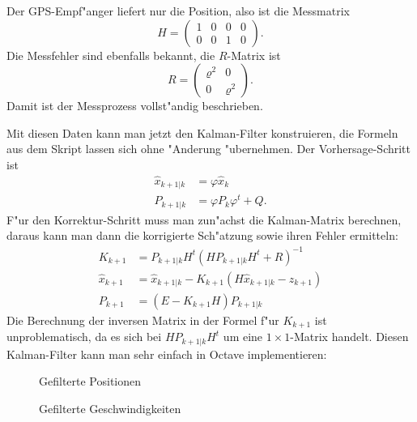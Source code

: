 \begin{loesung}
Der GPS-Empf"anger liefert nur die Position, also ist die Messmatrix
\[
H=
\begin{pmatrix}
1&0&0&0\\
0&0&1&0
\end{pmatrix}.
\]
Die Messfehler sind ebenfalls bekannt, die $R$-Matrix ist
\[
R=\begin{pmatrix}
\varrho^2&0\\
0&\varrho^2
\end{pmatrix}.
\]
Damit ist der Messprozess vollst"andig beschrieben.

Mit diesen Daten kann man jetzt den Kalman-Filter konstruieren, die
Formeln aus dem Skript lassen sich ohne "Anderung "ubernehmen.
Der Vorhersage-Schritt ist
\begin{align*}
\hat x_{k+1|k}&=\varphi \hat x_k
\\
P_{k+1|k}&=\varphi P_k\varphi^t+Q.
\end{align*}
F"ur den Korrektur-Schritt muss man zun"achst die Kalman-Matrix 
berechnen, daraus kann man dann die korrigierte Sch"atzung sowie
ihren Fehler ermitteln:
\begin{align*}
K_{k+1}&=P_{k+1|k}H^t(HP_{k+1|k}H^t+R)^{-1}
\\
\hat x_{k+1}&=
\hat x_{k+1|k} - K_{k+1}(H\hat x_{k+1|k}-z_{k+1})
\\
P_{k+1}&=(E-K_{k+1}H)P_{k+1|k}
\end{align*}
Die Berechnung der inversen Matrix in der Formel f"ur $K_{k+1}$ ist
unproblematisch, da es sich bei $HP_{k+1|k}H^t$ um eine $1\times 1$-Matrix
handelt.
Diesen Kalman-Filter kann man sehr einfach in Octave implementieren:
{\small
{}
}
\begin{figure}
\caption{Gefilterte Positionen}
\end{figure}
\begin{figure}
\caption{Gefilterte Geschwindigkeiten}
\end{figure}
\end{loesung}


